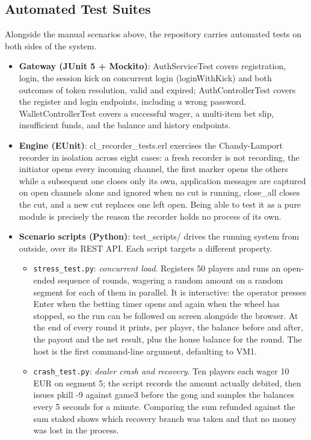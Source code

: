 \documentclass[12pt,a4paper]{article}
\begin{document}
\subsection{Automated Test Suites}
Alongside the manual scenarios above, the repository carries automated tests on both sides of the system.
\begin{itemize}
    \item \textbf{Gateway (JUnit 5 + Mockito)}: AuthServiceTest covers registration, login, the session kick on concurrent login (loginWithKick) and both outcomes of token resolution, valid and expired; AuthControllerTest covers the register and login endpoints, including a wrong password. WalletControllerTest covers a successful wager, a multi-item bet slip, insufficient funds, and the balance and history endpoints.
    \item \textbf{Engine (EUnit)}: cl\_\allowbreak recorder\_\allowbreak tests.erl exercises the Chandy-Lamport recorder in isolation across eight cases: a fresh recorder is not recording, the initiator opens every incoming channel, the first marker opens the others while a subsequent one closes only its own, application messages are captured on open channels alone and ignored when no cut is running, close\_\allowbreak all closes the cut, and a new cut replaces one left open. Being able to test it as a pure module is precisely the reason the recorder holds no process of its own.
    \item \textbf{Scenario scripts (Python)}: test\_\allowbreak scripts/ drives the running system from outside, over its REST API. Each script targets a different property.
    \begin{itemize}
        \item \texttt{stress\_\allowbreak test.py}: \textit{concurrent load}. Registers 50 players and runs an open-ended sequence of rounds, wagering a random amount on a random segment for each of them in parallel. It is interactive: the operator presses Enter when the betting timer opens and again when the wheel has stopped, so the run can be followed on screen alongside the browser. At the end of every round it prints, per player, the balance before and after, the payout and the net result, plus the house balance for the round. The host is the first command-line argument, defaulting to VM1.
        \item \texttt{crash\_\allowbreak test.py}: \textit{dealer crash and recovery}. Ten players each wager 10 EUR on segment 5; the script records the amount actually debited, then issues pkill -9 against game3 before the gong and samples the balances every 5 seconds for a minute. Comparing the sum refunded against the sum staked shows which recovery branch was taken and that no money was lost in the process.

\end{itemize}
\end{itemize}
\end{document}
